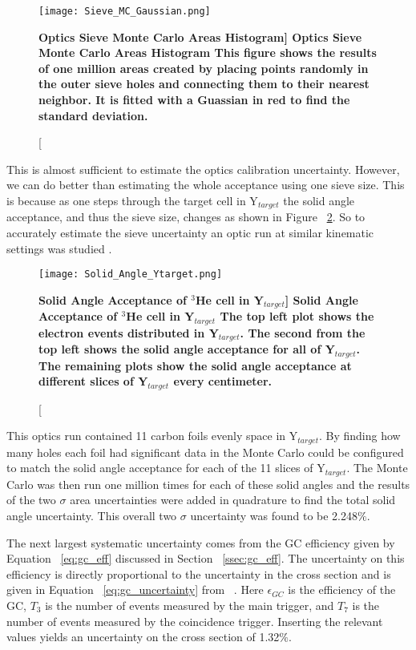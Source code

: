 \begin{figure}[!ht]
\begin{center}
\texttt{[image: Sieve\_MC\_Gaussian.png]}
\end{center}
\caption[\bf{Optics Sieve Monte Carlo Areas Histogram}]{
{\bf{Optics Sieve Monte Carlo Areas Histogram}} This figure shows the results of one million areas created by placing points randomly in the outer sieve holes and connecting them to their nearest neighbor. It is fitted with a Guassian in red to find the standard deviation.}
\label{fig:sieve_mc_gaussian}
\end{figure}

This is almost sufficient to estimate the optics calibration uncertainty. However, we can do better than estimating the whole acceptance using one sieve size. This is because as one steps through the target cell in Y$_{target}$ the solid angle acceptance, and thus the sieve size, changes as shown in Figure ~\ref{fig:solid_angle_ytarget}. So to accurately estimate the sieve uncertainty an optic run at similar kinematic settings was studied \cite{shujie_optics}. 

\begin{figure}[!ht]
\begin{center}
\texttt{[image: Solid\_Angle\_Ytarget.png]}
\end{center}
\caption[\bf{Solid Angle Acceptance of $^3$He cell in Y$_{target}$}]{
{\bf{Solid Angle Acceptance of $^3$He cell in Y$_{target}$}} The top left plot shows the electron events distributed in Y$_{target}$. The second from the top left shows the solid angle acceptance for all of Y$_{target}$. The remaining plots show the solid angle acceptance at different slices of Y$_{target}$ every centimeter.}
\label{fig:solid_angle_ytarget}
\end{figure}

This optics run contained 11 carbon foils evenly space in Y$_{target}$. By finding how many holes each foil had significant data in the Monte Carlo could be configured to match the solid angle acceptance for each of the 11 slices of Y$_{target}$. The Monte Carlo was then run one million times for each of these solid angles and the results of the two $\sigma$ area uncertainties were added in quadrature to find the total solid angle uncertainty. This overall two $\sigma$ uncertainty was found to be 2.248$\%$.

The next largest systematic uncertainty comes from the GC efficiency given by Equation ~\ref{eq:gc_eff} discussed in Section ~\ref{ssec:gc_eff}. The uncertainty on this efficiency is directly proportional to the uncertainty in the cross section and is given in Equation ~\ref{eq:gc_uncertainty} from ~\cite{dien_gc}. Here $\epsilon_{GC}$ is the efficiency of the GC, $T_3$ is the number of events measured by the main trigger, and $T_7$ is the number of events measured by the coincidence trigger. Inserting the relevant values yields an uncertainty on the cross section of 1.32$\%$.


